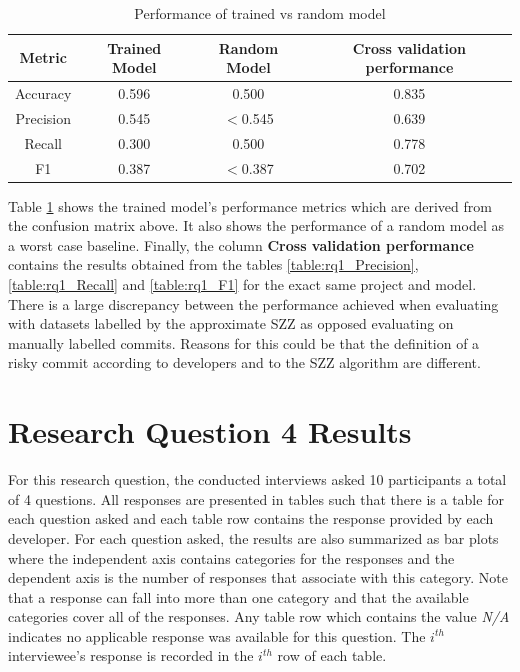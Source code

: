 \documentclass[../main.tex]{subfiles}
\begin{document}
\begin{table}[H]
    \centering
    \caption{Performance of trained vs random model}
    \begin{tabular}{|c|c|c|c|} 
    \hline
    \textbf{Metric} & \textbf{Trained Model} & \textbf{Random Model} & \textbf{Cross validation performance}\\ 
    \hline\hline
     Accuracy & 0.596 & 0.500 & 0.835 \\
     Precision & 0.545 & $<$0.545 & 0.639\\
     Recall & 0.300 & 0.500 & 0.778 \\
     F1 & 0.387 & $<$0.387 & 0.702\\
     \hline
    \end{tabular}
    \label{table:rq3Perf}
\end{table}

Table \ref{table:rq3Perf} shows the trained model's performance metrics which are derived from the confusion matrix above. It also shows the performance of a random model as a worst case baseline. Finally, the column \textbf{Cross validation performance} contains the results obtained from the tables \ref{table:rq1_Precision}, \ref{table:rq1_Recall} and \ref{table:rq1_F1} for the exact same project and model. There is a large discrepancy between the performance achieved when evaluating with datasets labelled by the approximate SZZ as opposed evaluating on manually labelled commits. Reasons for this could be that the definition of a risky commit according to developers and to the SZZ algorithm are different. 

\section{Research Question 4 Results}

For this research question, the conducted interviews asked 10 participants a total of 4 questions. All responses are presented in tables such that there is a table for each question asked and each table row contains the response provided by each developer. For each question asked, the results are also summarized as bar plots where the independent axis contains categories for the responses and the dependent axis is the number of responses that associate with this category. Note that a response can fall into more than one category and that the available categories cover all of the responses. Any table row which contains the value \textit{N/A} indicates no applicable response was available for this question. The $i^{th}$ interviewee's response is recorded in the $i^{th}$ row of each table.
\end{document}
